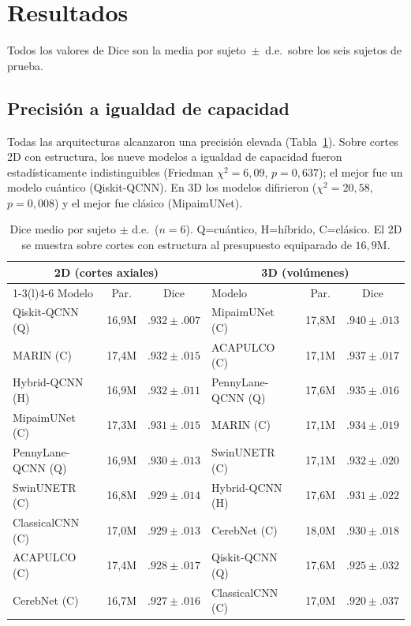 \documentclass[runningheads]{llncs}
\begin{document}
\section{Resultados}
Todos los valores de Dice son la media por sujeto~$\pm$~d.e.\ sobre los seis
sujetos de prueba.

\subsection{Precisión a igualdad de capacidad}
Todas las arquitecturas alcanzaron una precisión elevada
(Tabla~\ref{tab:main}). Sobre cortes 2D con estructura, los nueve modelos a
igualdad de capacidad fueron estadísticamente indistinguibles
(Friedman $\chi^2{=}6{,}09$, $p{=}0{,}637$); el mejor fue un modelo cuántico
(Qiskit-QCNN). En 3D los modelos difirieron ($\chi^2{=}20{,}58$,
$p{=}0{,}008$) y el mejor fue clásico (MipaimUNet).

\begin{table}[t]
\centering
\caption{Dice medio por sujeto $\pm$ d.e.\ ($n{=}6$). Q=cuántico, H=híbrido,
C=clásico. El 2D se muestra sobre cortes con estructura al presupuesto
equiparado de $16{,}9$M.}
\label{tab:main}
\small
\setlength{\tabcolsep}{4pt}
\begin{tabular}{lcc@{\hskip 1em}lcc}
\toprule
\multicolumn{3}{c}{\textbf{2D (cortes axiales)}} &
\multicolumn{3}{c}{\textbf{3D (volúmenes)}}\\
\cmidrule(r){1-3}\cmidrule(l){4-6}
Modelo & Par. & Dice & Modelo & Par. & Dice\\
\midrule
Qiskit-QCNN (Q)    & 16,9M & $.932{\pm}.007$ & MipaimUNet (C)     & 17,8M & $.940{\pm}.013$\\
MARIN (C)          & 17,4M & $.932{\pm}.015$ & ACAPULCO (C)       & 17,1M & $.937{\pm}.017$\\
Hybrid-QCNN (H)    & 16,9M & $.932{\pm}.011$ & PennyLane-QCNN (Q) & 17,6M & $.935{\pm}.016$\\
MipaimUNet (C)     & 17,3M & $.931{\pm}.015$ & MARIN (C)          & 17,1M & $.934{\pm}.019$\\
PennyLane-QCNN (Q) & 16,9M & $.930{\pm}.013$ & SwinUNETR (C)      & 17,1M & $.932{\pm}.020$\\
SwinUNETR (C)      & 16,8M & $.929{\pm}.014$ & Hybrid-QCNN (H)    & 17,6M & $.931{\pm}.022$\\
ClassicalCNN (C)   & 17,0M & $.929{\pm}.013$ & CerebNet (C)       & 18,0M & $.930{\pm}.018$\\
ACAPULCO (C)       & 17,4M & $.928{\pm}.017$ & Qiskit-QCNN (Q)    & 17,6M & $.925{\pm}.032$\\
CerebNet (C)       & 16,7M & $.927{\pm}.016$ & ClassicalCNN (C)   & 17,0M & $.920{\pm}.037$\\
\bottomrule
\end{tabular}
\end{table}
\end{document}
